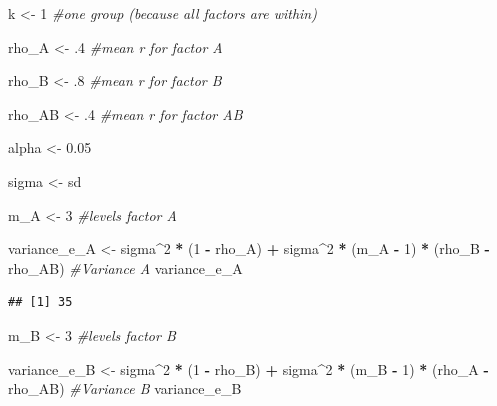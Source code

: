 \documentclass[
]{book}
\newenvironment{Shaded}{\begin{snugshade}}{\end{snugshade}}
\newcommand{\CommentTok}[1]{\textcolor[rgb]{0.56,0.35,0.01}{\textit{#1}}}
\newcommand{\DecValTok}[1]{\textcolor[rgb]{0.00,0.00,0.81}{#1}}
\newcommand{\FloatTok}[1]{\textcolor[rgb]{0.00,0.00,0.81}{#1}}
\newcommand{\NormalTok}[1]{#1}
\newcommand{\OperatorTok}[1]{\textcolor[rgb]{0.81,0.36,0.00}{\textbf{#1}}}
\newcommand{\StringTok}[1]{\textcolor[rgb]{0.31,0.60,0.02}{#1}}
\begin{document}
\begin{Shaded}
\begin{Highlighting}[]
\NormalTok{k <-}\StringTok{ }\DecValTok{1} \CommentTok{#one group (because all factors are within)}

\NormalTok{rho_A <-}\StringTok{ }\FloatTok{.4} \CommentTok{#mean r for factor A}

\NormalTok{rho_B <-}\StringTok{ }\FloatTok{.8} \CommentTok{#mean r for factor B}

\NormalTok{rho_AB <-}\StringTok{ }\FloatTok{.4} \CommentTok{#mean r for factor AB}

\NormalTok{alpha <-}\StringTok{ }\FloatTok{0.05}

\NormalTok{sigma <-}\StringTok{ }\NormalTok{sd}

\NormalTok{m_A <-}\StringTok{ }\DecValTok{3} \CommentTok{#levels factor A}

\NormalTok{variance_e_A <-}\StringTok{ }\NormalTok{sigma}\OperatorTok{^}\DecValTok{2} \OperatorTok{*}\StringTok{ }\NormalTok{(}\DecValTok{1} \OperatorTok{-}\StringTok{ }\NormalTok{rho_A) }\OperatorTok{+}\StringTok{ }
\StringTok{  }\NormalTok{sigma}\OperatorTok{^}\DecValTok{2} \OperatorTok{*}\StringTok{ }\NormalTok{(m_A }\OperatorTok{-}\StringTok{ }\DecValTok{1}\NormalTok{) }\OperatorTok{*}\StringTok{ }\NormalTok{(rho_B }\OperatorTok{-}\StringTok{ }\NormalTok{rho_AB) }
\CommentTok{#Variance A}
\NormalTok{variance_e_A}
\end{Highlighting}
\end{Shaded}

\begin{verbatim}
## [1] 35
\end{verbatim}

\begin{Shaded}
\begin{Highlighting}[]
\NormalTok{m_B <-}\StringTok{ }\DecValTok{3} \CommentTok{#levels factor B}

\NormalTok{variance_e_B <-}\StringTok{ }\NormalTok{sigma}\OperatorTok{^}\DecValTok{2} \OperatorTok{*}\StringTok{ }\NormalTok{(}\DecValTok{1} \OperatorTok{-}\StringTok{ }\NormalTok{rho_B) }\OperatorTok{+}\StringTok{ }
\StringTok{  }\NormalTok{sigma}\OperatorTok{^}\DecValTok{2} \OperatorTok{*}\StringTok{ }\NormalTok{(m_B }\OperatorTok{-}\StringTok{ }\DecValTok{1}\NormalTok{) }\OperatorTok{*}\StringTok{ }\NormalTok{(rho_A }\OperatorTok{-}\StringTok{ }\NormalTok{rho_AB)}
\CommentTok{#Variance B}
\NormalTok{variance_e_B}
\end{Highlighting}
\end{Shaded}
\end{document}
